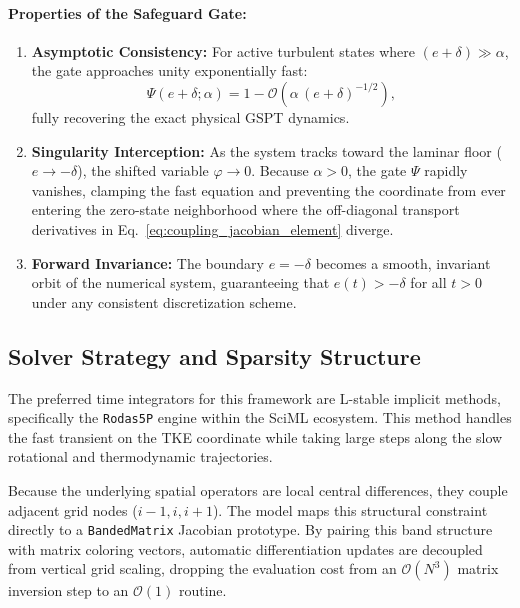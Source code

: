 \documentclass[11pt,letterpaper]{article}
\begin{document}
\paragraph{Properties of the Safeguard Gate:}
\begin{enumerate}
    \item \textbf{Asymptotic Consistency:} For active turbulent states where $(e+\delta) \gg \alpha$, the gate approaches unity exponentially fast:
    \begin{equation}
    \Psi(e+\delta; \alpha) = 1 - \mathcal{O}\left( \alpha\,(e+\delta)^{-1/2} \right),
    \end{equation}
    fully recovering the exact physical GSPT dynamics.
    \item \textbf{Singularity Interception:} As the system tracks toward the laminar floor ($e \to -\delta$), the shifted variable $\varphi \to 0$. Because $\alpha > 0$, the gate $\Psi$ rapidly vanishes, clamping the fast equation and preventing the coordinate from ever entering the zero-state neighborhood where the off-diagonal transport derivatives in Eq.~\eqref{eq:coupling_jacobian_element} diverge.
    \item \textbf{Forward Invariance:} The boundary $e = -\delta$ becomes a smooth, invariant orbit of the numerical system, guaranteeing that $e(t) > -\delta$ for all $t > 0$ under any consistent discretization scheme.
\end{enumerate}

\subsection{Solver Strategy and Sparsity Structure}
\label{subsec:solver_strategy}

The preferred time integrators for this framework are L-stable implicit methods, specifically the \texttt{Rodas5P} engine within the SciML ecosystem. This method handles the fast transient on the TKE coordinate while taking large steps along the slow rotational and thermodynamic trajectories.

Because the underlying spatial operators are local central differences, they couple adjacent grid nodes ($i-1, i, i+1$). The model maps this structural constraint directly to a \texttt{BandedMatrix} Jacobian prototype. By pairing this band structure with matrix coloring vectors, automatic differentiation updates are decoupled from vertical grid scaling, dropping the evaluation cost from an $\mathcal{O}(N^3)$ matrix inversion step to an $\mathcal{O}(1)$ routine.
\end{document}
